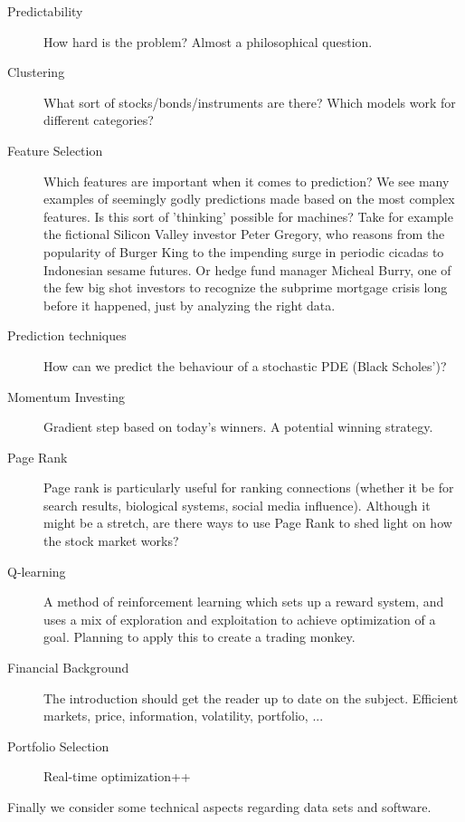 \documentclass[12pt, oneside]{article}
\begin{document}
\begin{description}

\item[Predictability] How hard is the problem? Almost a philosophical question. 

\item[Clustering] What sort of stocks/bonds/instruments are there? Which models work for different categories?

\item[Feature Selection] Which features are important when it comes to prediction? We see many examples of seemingly godly predictions made based on the most complex features. Is this sort of 'thinking' possible for machines? Take for example the fictional Silicon Valley investor Peter Gregory, who reasons from the popularity of Burger King to the impending surge in periodic cicadas to Indonesian sesame futures. Or hedge fund manager Micheal Burry, one of the few big shot investors to recognize the subprime mortgage crisis long before it happened, just by analyzing the right data.

\item[Prediction techniques] How can we predict the behaviour of a stochastic PDE (Black Scholes')? 

\item[Momentum Investing] Gradient step based on today's winners. A potential winning strategy.

\item[Page Rank] Page rank is particularly useful for ranking connections (whether it be for search results, biological systems, social media influence). Although it might be a stretch, 
are there ways to use Page Rank to shed light on how the stock market works? 

\item[Q-learning] A method of reinforcement learning which sets up a reward system, and uses a mix of exploration and exploitation to achieve optimization of a goal. Planning to apply this to create a trading monkey.

\item[Financial Background] The introduction should get the reader up to date on the subject. Efficient markets, price, information, volatility, portfolio, ...

\item[Portfolio Selection] Real-time optimization++

\end{description}
Finally we consider some technical aspects regarding data sets and software.
\end{document}
